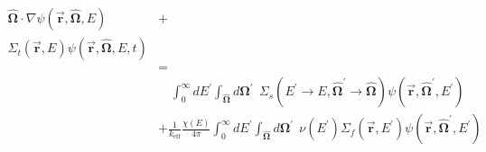 \begin{equation}
\label{time_ind_NTE}
\begin{split}
\boldsymbol{\hat{\Omega}}  \cdot \nabla \psi(\boldsymbol{\vec{r}},\boldsymbol{\hat{\Omega}},E) &+ \\
\Sigma_t(\boldsymbol{\vec{r}},E) \psi(\boldsymbol{\vec{r}},\boldsymbol{\hat{\Omega}},E,t) & \\
& =  \\
& \quad \int_0^\infty dE^\prime   \int_{\boldsymbol{\hat{\Omega}}} d\boldsymbol{\Omega}^\prime \:\: \Sigma_s(E^\prime \rightarrow E,\boldsymbol{\hat{\Omega}}^\prime \rightarrow \boldsymbol{\hat{\Omega}}) \psi(\boldsymbol{\vec{r}},\boldsymbol{\hat{\Omega}}^\prime,E^\prime)  \\
&+ \frac{1}{k_{\mathrm{eff}}}\frac{\chi(E)}{4\pi} \int_0^\infty dE^\prime  \int_{\boldsymbol{\hat{\Omega}}}  d\boldsymbol{\Omega}^\prime \:\:  \nu(E^\prime) \Sigma_f(\boldsymbol{\vec{r}},E^\prime) \psi(\boldsymbol{\vec{r}},\boldsymbol{\hat{\Omega}}^\prime,E^\prime)  \\
\end{split}
 \end{equation}
 



